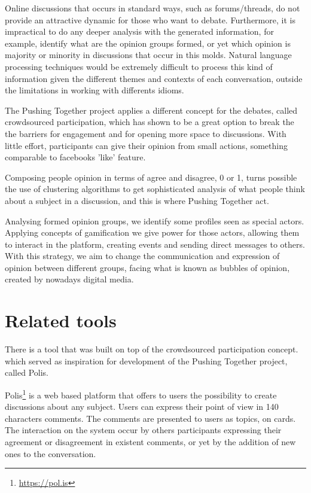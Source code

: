 \documentclass{llncs}
\begin{document}
  Online discussions that occurs in standard ways, such as forums/threads, do not
  provide an attractive dynamic for those who want to debate. Furthermore, it is
  impractical to do any deeper analysis with the generated information, for example,
  identify what are the opinion groups formed, or yet which opinion is majority
  or minority in discussions that occur in this molds. Natural language processing
  techniques would be extremely difficult to process this kind of information
  given the different themes and contexts of each conversation, outside the
  limitations in working with differents idioms.

  The Pushing Together project applies a different concept for the debates,
  called crowdsourced participation, which has shown to be a great option to break the
  the barriers for engagement and for opening more space to discussions. With little
  effort, participants can give their opinion from small actions,
  something comparable to facebooks 'like' feature.

  Composing people opinion in terms of agree and disagree, 0 or 1, turns possible
  the use of clustering algorithms to get sophisticated analysis of what people
  think about a subject in a discussion, and this is where Pushing Together act.

  Analysing formed opinion groups, we identify some profiles seen as special actors.
  Applying concepts of gamification we give power for those actors, allowing
  them to interact in the platform, creating events and sending direct messages
  to others. With this strategy, we aim to change the communication and expression
  of opinion between different groups, facing what is known as bubbles of opinion,
  created by nowadays digital media.  


\section{Related tools}

  There is a tool that was built on top of the crowdsourced participation concept.
  which served as inspiration for development of the Pushing Together project,
  called Polis.

  Polis\footnote{\url{https://pol.is}} is a web based platform that offers to
  users the possibility to create discussions about any subject. Users can express
  their point of view in 140 characters comments. The comments are
  presented to users as topics, on cards. The interaction on the system occur
  by others participants expressing their agreement or disagreement
  in existent comments, or yet by the addition of new ones to the conversation.
\end{document}
